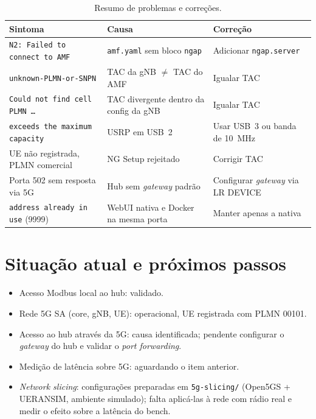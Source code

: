 \documentclass[11pt,a4paper]{article}
\newcommand{\code}[1]{\texttt{#1}}
\begin{document}
\begin{table}[H]
\centering
\small
\begin{tabularx}{\textwidth}{@{}XXX@{}}
\toprule
Sintoma & Causa & Correção \\
\midrule
\code{N2: Failed to connect to AMF} & \code{amf.yaml} sem bloco \code{ngap} & Adicionar \code{ngap.server} \\
\code{unknown-PLMN-or-SNPN} & TAC da gNB $\neq$ TAC do AMF & Igualar TAC \\
\code{Could not find cell PLMN \ldots} & TAC divergente dentro da config da gNB & Igualar TAC \\
\code{exceeds the maximum capacity} & USRP em USB~2 & Usar USB~3 ou banda de 10~MHz \\
UE não registrada, PLMN comercial & NG Setup rejeitado & Corrigir TAC \\
Porta 502 sem resposta via 5G & Hub sem \emph{gateway} padrão & Configurar \emph{gateway} via LR DEVICE \\
\code{address already in use} (9999) & WebUI nativa e Docker na mesma porta & Manter apenas a nativa \\
\bottomrule
\end{tabularx}
\caption{Resumo de problemas e correções.}
\end{table}

\section{Situação atual e próximos passos}

\begin{itemize}
  \item Acesso Modbus local ao hub: validado.
  \item Rede 5G SA (core, gNB, UE): operacional, UE registrada com PLMN 00101.
  \item Acesso ao hub através da 5G: causa identificada; pendente configurar o
    \emph{gateway} do hub e validar o \emph{port forwarding}.
  \item Medição de latência sobre 5G: aguardando o item anterior.
  \item \emph{Network slicing}: configurações preparadas em \code{5g-slicing/}
    (Open5GS + UERANSIM, ambiente simulado); falta aplicá-las à rede com rádio
    real e medir o efeito sobre a latência do bench.
\end{itemize}
\end{document}
